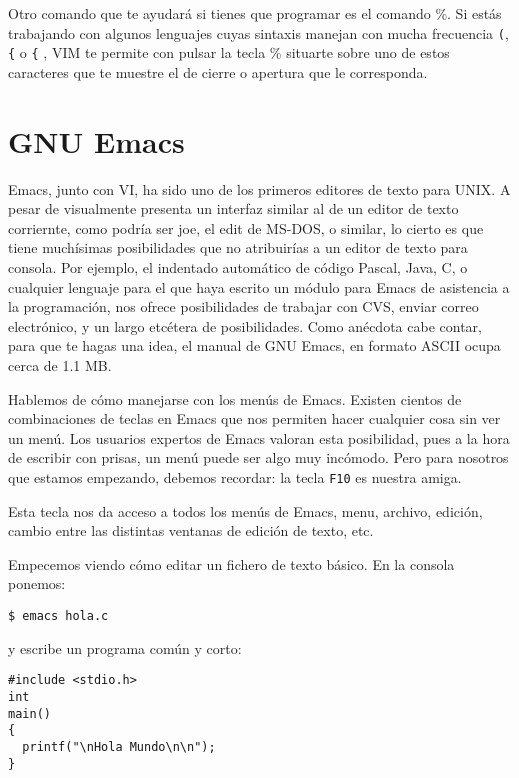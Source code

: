 Otro comando que te ayudará si  tienes que programar es el comando \%.
Si estás trabajando  con algunos lenguajes cuyas  sintaxis manejan con
mucha frecuencia \verb.(., \verb.{. o  \verb.{. , {\sf VIM} te permite
con pulsar la  tecla \% situarte sobre uno de  estos caracteres que te
muestre  el  de cierre  o  apertura  que  le corresponda.  

\section{GNU Emacs}
\label{emacs}

{\sf Emacs}, junto con {\sf VI},  ha sido uno de los primeros editores
de  texto para  UNIX.  A  pesar de  visualmente  presenta un  interfaz
similar al  de un  editor de  texto corriernte,  como podría  ser {\sf
joe},  el {\sf  edit} de  MS-DOS, o  similar, lo  cierto es  que tiene
muchísimas posibilidades que no atribuirías  a un editor de texto para
consola. Por ejemplo, el indentado  automático de código Pascal, Java,
C,  o cualquier  lenguaje  para el  que haya  escrito  un módulo  para
Emacs de  asistencia a  la programación,  nos ofrece  posibilidades de
trabajar con  CVS, enviar correo  electrónico, y un largo  etcétera de
posibilidades. Como anécdota cabe contar,  para que te hagas una idea,
el manual de GNU Emacs, en formato ASCII ocupa cerca de 1.1 MB.

Hablemos de cómo manejarse con los  menús de Emacs. Existen cientos de
combinaciones de teclas en Emacs que nos permiten hacer cualquier cosa
sin  ver  un  menú.  Los  usuarios  expertos  de  Emacs  valoran  esta
posibilidad, pues a la hora de  escribir con prisas, un menú puede ser
algo muy incómodo.  Pero para nosotros que  estamos empezando, debemos
recordar:
la tecla {\tt F10} es nuestra amiga.

Esta tecla  nos da acceso a  todos los menús de  Emacs, menu, archivo,
edición, cambio entre las distintas ventanas de edición de texto, etc.

Empecemos viendo cómo editar un fichero de texto básico. En la consola
ponemos:

\begin{verbatim}
$ emacs hola.c
\end{verbatim}

y escribe un programa común y corto:

\begin{verbatim}
#include <stdio.h>
int
main()
{
  printf("\nHola Mundo\n\n");
}
\end{verbatim}

